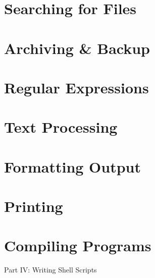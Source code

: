 \documentclass[oneside]{book}
\numberwithin{equation}{section}
\begin{document}
\section{Searching for Files}


\section{Archiving \& Backup}


\section{Regular Expressions}


\section{Text Processing}


\section{Formatting Output}


\section{Printing}


\section{Compiling Programs}


\begin{center}
	\huge Part IV: Writing Shell Scripts
\end{center}
\end{document}
